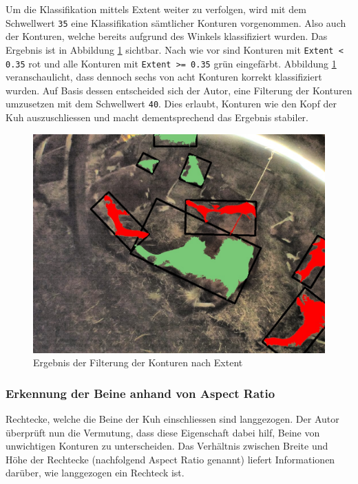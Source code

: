 Um die Klassifikation mittels Extent weiter zu verfolgen, wird mit dem Schwellwert \texttt{35} eine Klassifikation sämtlicher Konturen vorgenommen. Also auch der Konturen, welche bereits aufgrund des Winkels klassifiziert wurden. Das Ergebnis ist in Abbildung \ref{fig: Ergebnis der Filterung der Konturen nach Extent} sichtbar. Nach wie vor sind Konturen mit \texttt{Extent < 0.35} rot und alle Konturen mit \texttt{Extent >= 0.35} grün eingefärbt. Abbildung \ref{fig: Ergebnis der Filterung der Konturen nach Extent} veranschaulicht, dass dennoch sechs von acht Konturen korrekt klassifiziert wurden. Auf Basis dessen entscheided sich der Autor, eine Filterung der Konturen umzusetzen mit dem Schwellwert  \texttt{40}. Dies erlaubt, Konturen wie den Kopf der Kuh auszuschliessen und macht dementsprechend das Ergebnis stabiler.
\begin{figure}[H]
	\center
	\includegraphics[scale=0.43]{Grafiken/entwicklung/26ExtentDemonstration.jpg}
	\caption{Ergebnis der Filterung der Konturen nach Extent } 
	\label{fig: Ergebnis der Filterung der Konturen nach Extent} 
\end{figure}
\subsubsection{Erkennung der Beine anhand von Aspect Ratio}

Rechtecke, welche die Beine der Kuh einschliessen sind langgezogen. Der Autor überprüft nun die Vermutung, dass diese Eigenschaft dabei hilf, Beine von unwichtigen Konturen zu unterscheiden. Das Verhältnis zwischen Breite und Höhe der Rechtecke (nachfolgend Aspect Ratio genannt) liefert Informationen darüber, wie langgezogen ein Rechteck ist.	
	
